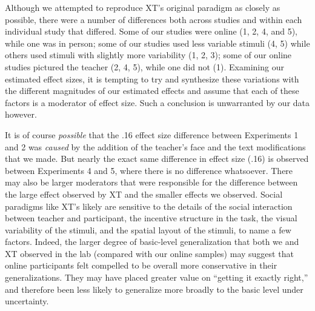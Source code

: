 \documentclass[man]{apa2}
\begin{document}
Although we attempted to reproduce XT's original paradigm as closely as possible, there were a number of differences both across studies and within each individual study that differed. Some of our studies were online (1, 2, 4, and 5), while one was in person; some of our studies used less variable stimuli (4, 5) while others used stimuli with slightly more variability (1, 2, 3); some of our online studies pictured the teacher (2, 4, 5), while one did not (1). Examining our estimated effect sizes, it is tempting to try and synthesize these variations with the different magnitudes of our estimated effects and assume that each of these factors is a moderator of effect size. Such a conclusion is unwarranted by our data however. 

It is of course \emph{possible} that the .16 effect size difference between Experiments 1 and 2 was \emph{caused} by the addition of the teacher's face and the text modifications that we made. But nearly the exact same difference in effect size (.16) is observed between Experiments 4 and 5, where there is no difference whatsoever. 
There may also be larger moderators that were responsible for the difference between the large effect observed by XT and the smaller effects we observed. Social paradigms like XT's likely are sensitive to the details of the social interaction between teacher and participant, the incentive structure in the task, the visual variability of the stimuli, and the spatial layout of the stimuli, to name a few factors. Indeed, the larger degree of basic-level generalization that both we and XT observed in the lab (compared with our online samples) may suggest that online participants felt compelled to be overall more conservative in their generalizations. They may have placed greater value on ``getting it exactly right,'' and therefore been less likely to generalize more broadly to the basic level under uncertainty. 
\end{document}
